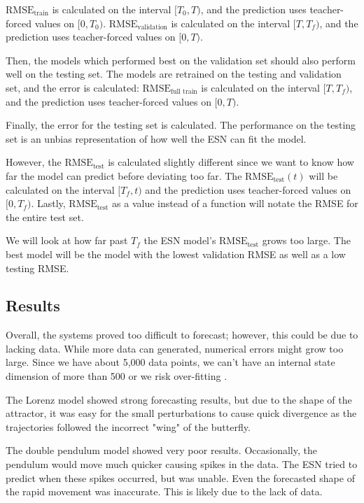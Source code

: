 \documentclass{article}
\begin{document}
$\text{RMSE}_\text{train}$ is calculated on the interval $[T_0, T)$, and the
prediction uses teacher-forced values on $[0, T_0)$.
$\text{RMSE}_\text{validation}$ is calculated on the interval $[T, T_f)$, and
the prediction uses teacher-forced values on $[0, T)$.

Then, the models which performed best on the validation set should also
perform well on the testing set. The models are retrained on the testing and
validation set, and the error is calculated: $\text{RMSE}_\text{full train}$
is calculated on the interval $[T, T_f)$, and the prediction uses
teacher-forced values on $[0, T)$.

Finally, the error for the testing set is calculated. The performance on the
testing set is an unbias representation of how well the ESN can fit the
model.

However, the $\text{RMSE}_\text{test}$ is calculated slightly different since
we want to know how far the model can predict before deviating too far. The
$\text{RMSE}_\text{test}(t)$ will be calculated on the interval $[T_f,
t)$ and the prediction uses teacher-forced values on $[0, T_f)$. Lastly,
$\text{RMSE}_\text{test}$ as a value instead of a function
will notate the RMSE for the entire test set.

We will look at how far past $T_f$ the ESN model's $\text{RMSE}_\text{test}$
grows too large. The best model will be the model with the lowest validation 
RMSE as well as a low testing RMSE.

\subsection{Results}

Overall, the systems proved too difficult to forecast; however, this could 
be due to lacking data. While more data can generated, numerical errors might 
grow too large. Since we have about 5,000 data points, we can't have an 
internal state dimension of more than 500 or we risk over-fitting 
\cite{jaeger2002tutorial}.

The Lorenz model showed strong forecasting results, but due to the shape of 
the attractor, it was easy for the small perturbations to cause quick 
divergence as the trajectories followed the incorrect "wing" of the butterfly.

The double pendulum model showed very poor results. Occasionally, the pendulum
would move much quicker causing spikes in the data. The ESN tried to predict 
when these spikes occurred, but was unable. Even the forecasted shape of the 
rapid movement was inaccurate. This is likely due to the lack of data.
\end{document}
